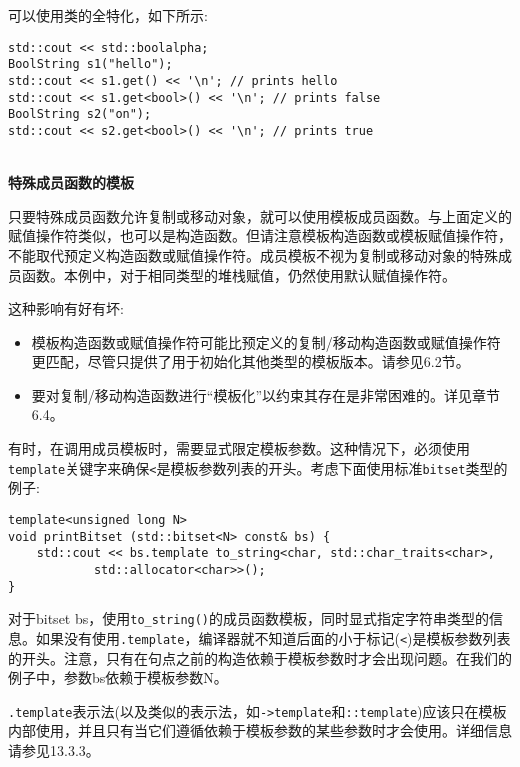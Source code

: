 可以使用类的全特化，如下所示:

\begin{lstlisting}[style=styleCXX]
std::cout << std::boolalpha;
BoolString s1("hello");
std::cout << s1.get() << '\n'; // prints hello
std::cout << s1.get<bool>() << '\n'; // prints false
BoolString s2("on");
std::cout << s2.get<bool>() << '\n'; // prints true
\end{lstlisting}

\hspace*{\fill} \\ %
\noindent
\textbf{特殊成员函数的模板}

只要特殊成员函数允许复制或移动对象，就可以使用模板成员函数。与上面定义的赋值操作符类似，也可以是构造函数。但请注意模板构造函数或模板赋值操作符，不能取代预定义构造函数或赋值操作符。成员模板不视为复制或移动对象的特殊成员函数。本例中，对于相同类型的堆栈赋值，仍然使用默认赋值操作符。

这种影响有好有坏:

\begin{itemize}
\item 
模板构造函数或赋值操作符可能比预定义的复制/移动构造函数或赋值操作符更匹配，尽管只提供了用于初始化其他类型的模板版本。请参见6.2节。

\item 
要对复制/移动构造函数进行“模板化”以约束其存在是非常困难的。详见章节6.4。
\end{itemize}


有时，在调用成员模板时，需要显式限定模板参数。这种情况下，必须使用\texttt{template}关键字来确保\texttt{<}是模板参数列表的开头。考虑下面使用标准\texttt{bitset}类型的例子:

\begin{lstlisting}[style=styleCXX]
template<unsigned long N>
void printBitset (std::bitset<N> const& bs) {
	std::cout << bs.template to_string<char, std::char_traits<char>,
			std::allocator<char>>();
}
\end{lstlisting}

对于bitset bs，使用\texttt{to\_string()}的成员函数模板，同时显式指定字符串类型的信息。如果没有使用\texttt{.template}，编译器就不知道后面的小于标记(\texttt{<})是模板参数列表的开头。注意，只有在句点之前的构造依赖于模板参数时才会出现问题。在我们的例子中，参数bs依赖于模板参数N。

\texttt{.template}表示法(以及类似的表示法，如\texttt{->template}和\texttt{::template})应该只在模板内部使用，并且只有当它们遵循依赖于模板参数的某些参数时才会使用。详细信息请参见13.3.3。

